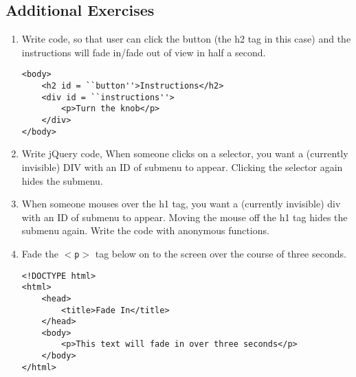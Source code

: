\documentclass[11pt,a4paper]{article}
\begin{document}
\subsection*{Additional Exercises}
\begin{enumerate}
\item Write code, so that user can click the button (the h2 tag in this case) and the instructions will fade in/fade out of view in half a second.
\begin{lstlisting}
<body>
    <h2 id = ``button''>Instructions</h2>
    <div id = ``instructions''>
        <p>Turn the knob</p>
    </div>
</body>
\end{lstlisting}
\item Write jQuery code, When someone clicks on a selector, you want a (currently invisible) DIV with an ID of submenu to appear.  Clicking the selector again hides the submenu.
\item When someone mouses over the h1 tag, you want a (currently invisible) div with an ID of submenu to appear. Moving the mouse off the h1 tag hides the submenu again. Write the code with anonymous functions.
\item Fade the \texttt{$<$p$>$} tag below on to the screen over the course of three seconds.
\begin{lstlisting}
<!DOCTYPE html>
<html>
    <head>
        <title>Fade In</title>
    </head>
    <body>
        <p>This text will fade in over three seconds</p>
    </body>
</html>
\end{lstlisting}
\end{enumerate}
\end{document}
